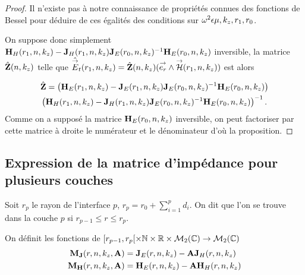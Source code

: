 \begin{proof}
      Il n'existe pas à notre connaissance de propriétés connues des fonctions de Bessel pour déduire de ces égalités des conditions sur \(\omega^2\eps\mu,k_z,r_1,r_0\).

      On suppose donc simplement \(\mH_{H}(r_1,n,k_z) - \mJ_{H}(r_1,n,k_z)\mJ_{E}(r_0,n,k_z)^{-1}\mH_{E}(r_0,n,k_z)\) inversible, la matrice \(\hat\mZ(n,k_z)\) telle que \(\hat\vE_t(r_1,n,k_z) = \hat\mZ(n,k_z) (\vect{e_r}\pvect\vH(r_1,n,k_z))\) est alors

      \begin{multline*}
        \hat \mZ =
        \left(\mH_{E}(r_1,n,k_z) - \mJ_{E}(r_1,n,k_z)\mJ_{E}(r_0,n,k_z)^{-1}\mH_{E}(r_0,n,k_z)\right)
        \\
        \left(\mH_{H}(r_1,n,k_z) - \mJ_{H}(r_1,n,k_z)\mJ_{E}(r_0,n,k_z)^{-1}\mH_{E}(r_0,n,k_z)\right)^{-1}.
      \end{multline*}
      Comme on a supposé la matrice \(\mH_E(r_0,n,k_z)\) inversible, on peut factoriser par cette matrice à droite le numérateur et le dénominateur d'où la proposition.

    \end{proof}


  \subsection{Expression de la matrice d'impédance pour plusieurs couches}

    \begin{figure}[!hbt]
      \centering
      \begin{tikzpicture}
        
      \end{tikzpicture}
    \end{figure}

    Soit \(r_p\) le rayon de l'interface \(p\), \(r_p = r_0 +\sum_{i=1}^{p} d_{i}\). On dit que l'on se trouve dans la couche \(p\) si \(r_{p-1} \le r \le r_p \).

    \begin{defn}
      \label{def:cylindre:matrices_MJ-MH}
      On définit les fonctions de \([r_{p-1}, r_p[\times \NN \times \RR \times \mathcal{M}_{2}(\CC) \rightarrow \mathcal{M}_{2}(\CC)\)
      \begin{align*}
        \mM_{\mJ}(r,n,k_z,\mA) &= \mJ_{E}(r,n,k_z) -  \mA \mJ_{H}(r,n,k_z)
        \\
        \mM_{\mH}(r,n,k_z,\mA) &= \mH_{E}(r,n,k_z) -  \mA \mH_{H}(r,n,k_z)
      \end{align*}
    \end{defn}

